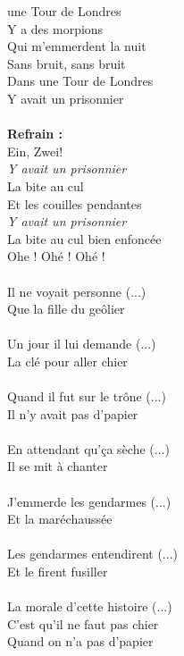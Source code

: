 
 une Tour de Londres
\\Y a des morpions 
\\Qui m'emmerdent la nuit
\\Sans bruit, sans bruit \bissimple
\\Dans une Tour de Londres
\\Y avait un prisonnier \bissimple
\\\\\textbf{Refrain :}
\\Ein, Zwei!
\\\textit{Y avait un prisonnier}
\\La bite au cul 
\\Et les couilles pendantes
\\\textit{Y avait un prisonnier}
\\La bite au cul bien enfoncée 
\\ Ohe ! Ohé ! Ohé ! \bissimple
\\\\Il ne voyait personne (...)
\\Que la fille du geôlier \bissimple
\\\\Un jour il lui demande (...)
\\La clé pour aller chier \bissimple
\\\\Quand il fut sur le trône (...)
\\Il n'y avait pas d'papier \bissimple
\\\\En attendant qu'ça sèche (...)
\\Il se mit à chanter \bissimple
\\\\J'emmerde les gendarmes (...)
\\Et la maréchaussée \bissimple
\\\\Les gendarmes entendirent (...)
\\Et le firent fusiller \bissimple
\\\\La morale d'cette histoire (...)
\\C'est qu'il ne faut pas chier 
\\Quand on n'a pas d'papier

\breakpage